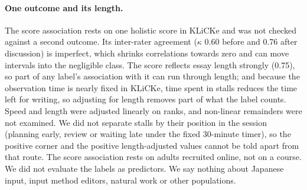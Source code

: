 \paragraph{One outcome and its length.} The score association rests on one holistic score in KLiCKe and was not checked
against a second outcome. Its inter-rater agreement ($\kappa$ 0.60 before and 0.76 after discussion) is imperfect, which shrinks
correlations towards zero and can move intervals into the negligible class. The score reflects essay length strongly (0.75), so part of any label's association with it
can run through length; and because the observation time is nearly fixed in KLiCKe, time spent in stalls reduces the
time left for writing, so adjusting for length removes part of what the label counts. Speed and length were adjusted linearly on ranks, and non-linear remainders were not examined.
We did not separate stalls by their position in the session (planning early, review or waiting late under the
fixed 30-minute timer), so the positive corner and the positive length-adjusted values cannot be told apart from that
route. The score association rests on adults recruited online, not on a course. We did not evaluate the labels as
predictors. We say nothing about Japanese input, input method editors, natural work
or other populations.
